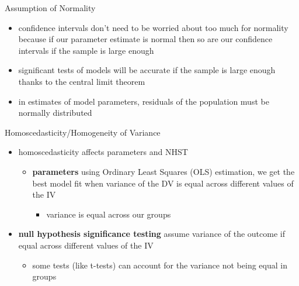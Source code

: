 \documentclass[
  ignorenonframetext,
]{beamer}
\providecommand{\tightlist}{%
  \setlength{\itemsep}{0pt}\setlength{\parskip}{0pt}}
\begin{document}
\begin{frame}{Assumption of Normality}
\protect\hypertarget{assumption-of-normality}{}
\begin{itemize}
\item
  confidence intervals don't need to be worried about too much for
  normality because if our parameter estimate is normal then so are our
  confidence intervals if the sample is large enough
\item
  significant tests of models will be accurate if the sample is large
  enough thanks to the central limit theorem
\item
  in estimates of model parameters, residuals of the population must be
  normally distributed
\end{itemize}
\end{frame}

\begin{frame}{Homoscedasticity/Homogeneity of Variance}
\protect\hypertarget{homoscedasticityhomogeneity-of-variance}{}
\begin{itemize}
\item
  homoscedasticity affects parameters and NHST

  \begin{itemize}
  \item
    \textbf{parameters} using Ordinary Least Squares (OLS) estimation,
    we get the best model fit when variance of the DV is equal across
    different values of the IV

    \begin{itemize}
    \tightlist
    \item
      variance is equal across our groups
    \end{itemize}
  \end{itemize}
\item
  \textbf{null hypothesis significance testing} assume variance of the
  outcome if equal across different values of the IV

  \begin{itemize}
  \tightlist
  \item
    some tests (like t-tests) can account for the variance not being
    equal in groups
  \end{itemize}
\end{itemize}
\end{frame}
\end{document}
